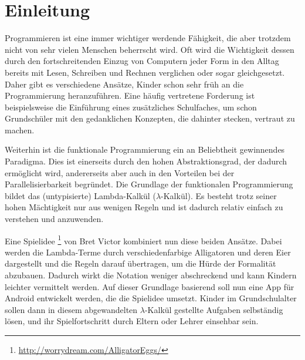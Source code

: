 \section{Einleitung}

Programmieren ist eine immer wichtiger werdende Fähigkeit, die aber trotzdem nicht von sehr vielen Menschen beherrscht wird.
Oft wird die Wichtigkeit dessen durch den fortschreitenden Einzug von Computern jeder Form in den Alltag bereits mit Lesen, Schreiben und Rechnen verglichen oder sogar gleichgesetzt.
Daher gibt es verschiedene Ansätze, Kinder schon sehr früh an die Programmierung heranzuführen.
Eine häufig vertretene Forderung ist beispielsweise die Einführung eines zusätzliches Schulfaches, um schon Grundschüler mit den gedanklichen Konzepten, die dahinter stecken, vertraut zu machen.

Weiterhin ist die funktionale Programmierung ein an Beliebtheit gewinnendes Paradigma.
Dies ist einerseits durch den hohen Abstraktionsgrad, der dadurch ermöglicht wird, andererseits aber auch in den Vorteilen bei der Parallelisierbarkeit begründet.
Die Grundlage der funktionalen Programmierung bildet das (untypisierte) Lambda-Kalkül (\(\lambda\)-Kalkül).
Es besteht trotz seiner hohen Mächtigkeit nur aus wenigen Regeln und ist dadurch relativ einfach zu verstehen und anzuwenden.

Eine Spielidee \footnote{\url{http://worrydream.com/AlligatorEggs/}} von Bret Victor kombiniert nun diese beiden Ansätze.
Dabei werden die Lambda-Terme durch verschiedenfarbige Alligatoren und deren Eier dargestellt und die Regeln darauf übertragen, um die Hürde der Formalität abzubauen.
Dadurch wirkt die Notation weniger abschreckend und kann Kindern leichter vermittelt werden.
Auf dieser Grundlage basierend soll nun eine App für Android entwickelt werden, die die Spielidee umsetzt.
Kinder im Grundschulalter sollen dann in diesem abgewandelten \(\lambda\)-Kalkül gestellte Aufgaben selbständig lösen, und ihr Spielfortschritt durch Eltern oder Lehrer einsehbar sein.
